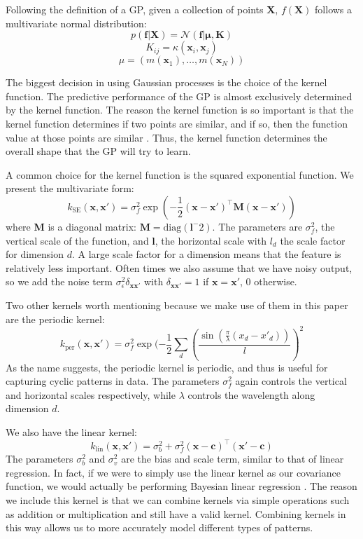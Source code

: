 \documentclass[letterpaper, 12 pt, conference]{ieeeconf}  %
\newcommand{\bx}{\textbf{x}}
\newcommand{\bX}{\textbf{X}}
\newcommand{\bK}{\textbf{K}}
\begin{document}
Following the definition of a GP, given a collection of points \bX, $f(\bX)$ follows a multivariate normal distribution:
$$p(\textbf{f}|\bX) = \mathcal{N}(\textbf{f}|\bm{\mu}, \bK)$$
$$K_{ij} = \kappa(\bx_i, \bx_j)$$
$$\mu = (m(\bx_1), \dots, m(\bx_N))$$

The biggest decision in using Gaussian processes is the choice of the kernel function. The predictive performance of the GP is almost exclusively determined by the kernel function. The reason the kernel function is so important is that the kernel function determines if two points are similar, and if so, then the function value at those points are similar \cite{c2}. Thus, the kernel function determines the overall shape that the GP will try to learn.

A common choice for the kernel function is the squared exponential function. We present the multivariate form:
$$k_{\text{SE}}(\bx, \bx') = \sigma_f^2 \exp(-\frac{1}{2}(\bx - \bx')^\top \textbf{M} (\bx - \bx'))$$
where \textbf{M} is a diagonal matrix: $\textbf{M} = \text{diag}(\textbf{l}^-2)$. The parameters are $\sigma_f^2$, the vertical scale of the function, and $\textbf{l}$, the horizontal scale with $l_d$ the scale factor for dimension $d$. A large scale factor for a dimension means that the feature is relatively less important. Often times we also assume that we have noisy output, so we add the noise term $\sigma_\epsilon^2 \delta_{\bx\bx'}$ with $\delta_{\bx\bx'} = 1$ if $\bx = \bx'$, $0$ otherwise.

Two other kernels worth mentioning because we make use of them in this paper are the periodic kernel:
$$k_{\text{per}}(\bx, \bx') = \sigma_f^2 \exp(-\frac{1}{2} \sum_d (\frac{\sin(\frac{\pi}{\lambda} (x_d - x'_d))}{l})^2$$
As the name suggests, the periodic kernel is periodic, and thus is useful for capturing cyclic patterns in data. The parameters $\sigma_f^2$ again controls the vertical and horizontal scales respectively, while $\lambda$ controls the wavelength along dimension $d$.

We also have the linear kernel:
$$k_{\text{lin}}(\bx, \bx') = \sigma_b^2 + \sigma_f^2(\bx - \textbf{c})^\top(\bx' - \textbf{c})$$
The parameters $\sigma_b^2$ and $\sigma_v^2$ are the bias and scale term, similar to that of linear regression. In fact, if we were to simply use the linear kernel as our covariance function, we would actually be performing Bayesian linear regression \cite{c3}. The reason we include this kernel is that we can combine kernels via simple operations such as addition or multiplication and still have a valid kernel. Combining kernels in this way allows us to more accurately model different types of patterns.
\end{document}
